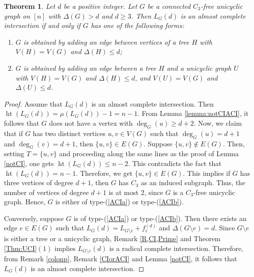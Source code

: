 \documentclass[11pt,a4paper,reqno]{amsart}
\newtheorem{thm}{Theorem}[section]
\theoremstyle{definition}
\numberwithin{equation}{section}
\DeclareMathOperator{\het}{ht}
\begin{document}
\begin{thm} \label{ACI:unicyclic}
    Let $d$ be a positive integer. Let $G$ be a connected $C_3$-free unicyclic graph on $[n]$ with $\Delta(G)>d$ and $d \geq 3$. Then $L_G(d)$ is an almost complete intersection if and only if $G$ has one of the following forms:
    \begin{enumerate}
        \item \label{ACIa} $G$ is obtained by adding an edge between vertices of a tree $H$ with $V(H)=V(G)$ and $\Delta(H) \leq d$;
        \item \label{ACIb} $G$ is obtained by adding an edge between a tree $H$ and a unicyclic graph $U$ with $V(H)=V(G)$ and $\Delta(H) \leq d$, and $V(U)=V(G)$ and $\Delta(U) \leq d$.
    \end{enumerate}
\end{thm}
\begin{proof}
    Assume that $L_G(d)$ is an almost complete intersection. Then $\het(L_G(d))=\mu(L_G(d))-1 = n-1$. From Lemma \ref{lemma:notCIACI}, it follows that $G$ does not have a vertex with $\deg_G(u) \geq d+2$. Now, we claim that if $G$ has two distinct vertices $u, v \in V(G)$ such that $\deg_G(u) = d+1$ and $\deg_G(v) = d+1$, then $\{u,v\} \in E(G)$. Suppose $\{u, v\} \notin E(G)$. Then, setting $T=\{u,v\}$ and proceeding along the same lines as the proof of Lemma \ref{notCI}, one gets $\het(L_G(d)) \leq n-2$. This contradicts the fact that $\het(L_G(d))= n-1$. Therefore, we get $\{u,v\} \in E(G)$. This implies if $G$ has three vertices of degree $d+1$, then $G$ has $C_3$ as an induced subgraph. Thus, the number of vertices of degree $d+1$ is at most $2$, since $G$ is a $C_3$-free unicyclic graph.  Hence, $G$ is either of type-(\ref{ACIa}) or type-(\ref{ACIb}).

\vspace{2mm}

    Conversely, suppose $G$ is of type-(\ref{ACIa}) or type-(\ref{ACIb}). Then there exists an edge $e\in E(G)$ such that $L_G(d) = L_{G\setminus e}+f_e^{(d)}$ and $\Delta(G\setminus e) = d$. Since $G\setminus e$ is either a tree or a unicyclic graph, Remark \ref{R,CI,Prime} and Theorem \ref{Thm:UCI}$(1)$ implies $L_{G\setminus e}(d)$ is a radical complete intersection. Therefore, from Remark \ref{colonp}, Remark \ref{CIorACI} and Lemma \ref{notCI}, it follows that $L_{G}(d)$ is an almost complete intersection.
\end{proof}
\end{document}
